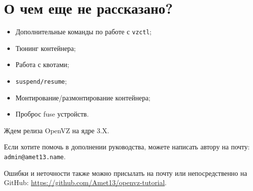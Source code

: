\section{О чем еще не рассказано?}

\begin{itemize}
    \item Дополнительные команды по работе с \texttt{vzctl};
    \item Тюнинг контейнера;
    \item Работа с квотами;
    \item \texttt{suspend/resume};
    \item Монтирование/размонтирование контейнера;
    \item Проброс fuse устройств.
\end{itemize}

Ждем релиза OpenVZ на ядре 3.X.

Если хотите помочь в дополнении руководства, можете написать автору на почту: \texttt{admin@amet13.name}.

Ошибки и неточности также можно присылать на почту или непосредственно на GitHub: \url{https://github.com/Amet13/openvz-tutorial}.

\clearpage
